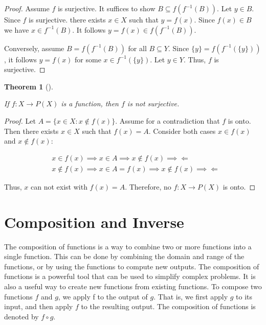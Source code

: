 \documentclass[
  letterpaper,
  10pt,
  reqno,
  twopage,
  openany]{book}
\theoremstyle{plain}
\theoremstyle{definition}
\theoremstyle{definition}
\theoremstyle{definition}
\theoremstyle{plain}
\theoremstyle{plain}
\newtheorem{theorem}{Theorem}[chapter]
\theoremstyle{remark}
\begin{document}
\begin{proof}

Assume \(f\) is surjective. It suffices to show
\(B\subseteq f(f^{-1}(B))\). Let \(y\in B\). Since \(f\) is surjective.
there exists \(x\in X\) such that \(y=f(x)\). Since \(f(x)\in B\) we
have \(x\in f^{-1}(B)\). It follows \(y=f(x)\in f(f^{-1}(B)).\)

Conversely, assume \(B=f(f^{-1}(B))\) for all \(B\subseteq Y\). Since
\(\{y\}=f(f^{-1}(\{y\}))\), it follows \(y=f(x)\) for some
\(x\in f^{-1}(\{y\})\). Let \(y\in Y\). Thus, \(f\) is surjective.

\end{proof}

\leavevmode{}%
\begin{theorem}[]\label{thm-not-surjective}

If \(f:X\rightarrow P(X)\) is a function, then \(f\) is not surjective.

\end{theorem}

\begin{proof}

Let \(A=\{x\in X : x\notin f(x)\}\). Assume for a contradiction that
\(f\) is onto. Then there exists \(x\in X\) such that \(f(x)=A\).
Consider both cases \(x\in f(x)\) and \(x\not\in f(x)\):

\begin{align*}
& x\in f(x) \implies x\in A \implies x\not\in f(x) 
\implies\Longleftarrow \\
& x\notin f(x) \implies x\in A=f(x) \implies x\not\in f(x) 
\implies\Longleftarrow
\end{align*}

Thus, \(x\) can not exist with \(f(x)=A\). Therefore, no
\(f:X\rightarrow P(X)\) is onto.

\end{proof}

\hypertarget{composition-and-inverse}{%
\section{Composition and Inverse}\label{composition-and-inverse}}

The composition of functions is a way to combine two or more functions
into a single function. This can be done by combining the domain and
range of the functions, or by using the functions to compute new
outputs. The composition of functions is a powerful tool that can be
used to simplify complex problems. It is also a useful way to create new
functions from existing functions. To compose two functions \(f\) and
\(g\), we apply f to the output of \(g.\) That is, we first apply \(g\)
to its input, and then apply \(f\) to the resulting output. The
composition of functions is denoted by \(f \circ g\).
\end{document}
